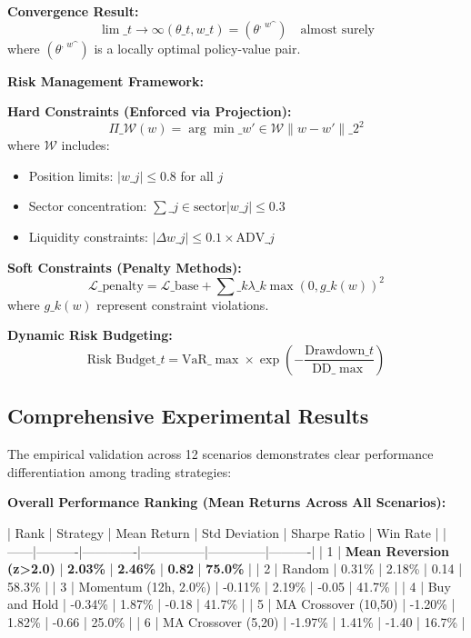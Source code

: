 \documentclass[11pt,a4paper]{article}
\begin{document}
\textbf{Convergence Result:}
\begin{equation}
\lim\_{t \to \infty} (\theta\_t, w\_t) = (\theta^\textit{, w^}) \quad \text{almost surely}
\end{equation}
where $(\theta^\textit{, w^})$ is a locally optimal policy-value pair.

\textbf{Risk Management Framework:}

\textbf{Hard Constraints (Enforced via Projection):}
\begin{equation}
\Pi\_{\mathcal{W}}(w) = \arg\min\_{w' \in \mathcal{W}} \|w - w'\|\_2^2
\end{equation}
where $\mathcal{W}$ includes:
\begin{itemize}
\item Position limits: $|w\_j| \leq 0.8$ for all $j$
\item Sector concentration: $\sum\_{j \in \text{sector}} |w\_j| \leq 0.3$
\item Liquidity constraints: $|\Delta w\_j| \leq 0.1 \times \text{ADV}\_j$

\end{itemize}
\textbf{Soft Constraints (Penalty Methods):}
\begin{equation}
\mathcal{L}\_{\text{penalty}} = \mathcal{L}\_{\text{base}} + \sum\_{k} \lambda\_k \max(0, g\_k(w))^2
\end{equation}
where $g\_k(w)$ represent constraint violations.

\textbf{Dynamic Risk Budgeting:}
\begin{equation}
\text{Risk Budget}\_t = \text{VaR}\_{\max} \times \exp\left(-\frac{\text{Drawdown}\_t}{\text{DD}\_{\max}}\right)
\end{equation}

\subsection{Comprehensive Experimental Results}

The empirical validation across 12 scenarios demonstrates clear performance differentiation among trading strategies:

\textbf{Overall Performance Ranking (Mean Returns Across All Scenarios):}

| Rank | Strategy | Mean Return | Std Deviation | Sharpe Ratio | Win Rate |
|------|----------|-------------|---------------|--------------|----------|
| 1 | \textbf{Mean Reversion (z>2.0)} | \textbf{2.03\%} | \textbf{2.46\%} | \textbf{0.82} | \textbf{75.0\%} |
| 2 | Random | 0.31\% | 2.18\% | 0.14 | 58.3\% |
| 3 | Momentum (12h, 2.0\%) | -0.11\% | 2.19\% | -0.05 | 41.7\% |
| 4 | Buy and Hold | -0.34\% | 1.87\% | -0.18 | 41.7\% |
| 5 | MA Crossover (10,50) | -1.20\% | 1.82\% | -0.66 | 25.0\% |
| 6 | MA Crossover (5,20) | -1.97\% | 1.41\% | -1.40 | 16.7\% |
\end{document}
